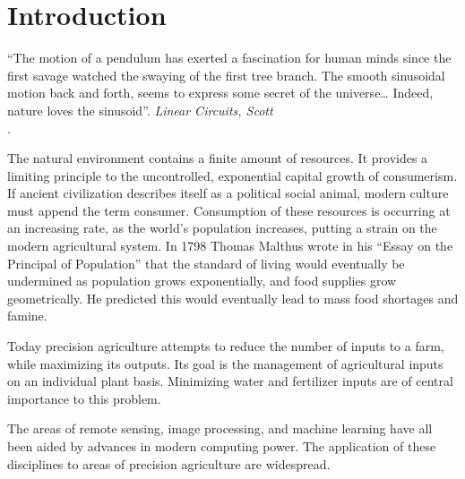 \chapter{Introduction}

\begin{center}
  \begin{minipage}{0.75\textwidth}
    \begin{small}
      “The motion of a pendulum has exerted a fascination for human minds since the first savage watched the swaying of the first tree branch. The smooth sinusoidal motion back and forth, seems to express some secret of the universe…
      Indeed, nature loves the sinusoid”.
      \emph{Linear Circuits, Scott}\\.
    \end{small}
  \end{minipage}
  \vspace{0.5cm}
\end{center}

\noindent The natural environment contains a finite amount of resources.  It provides a limiting principle to the uncontrolled, exponential capital growth of consumerism.  If ancient civilization describes itself as a political social animal, modern culture must append the term consumer. Consumption of these resources is occurring at an increasing rate, as the world’s population increases, putting a strain on the modern agricultural system.  In 1798 Thomas Malthus wrote in his “Essay on the Principal of Population” that the standard of living would eventually be undermined as population grows exponentially, and food supplies grow geometrically.  He predicted this would eventually lead to mass food shortages and famine.

Today precision agriculture attempts to reduce the number of inputs to a farm, while maximizing its outputs.  Its goal is the management of agricultural inputs on an individual plant basis.  Minimizing water and fertilizer inputs are of central importance to this problem.

The areas of remote sensing, image processing, and machine learning have all been aided by advances in modern computing power.  The application of these disciplines to areas of precision agriculture are widespread.

